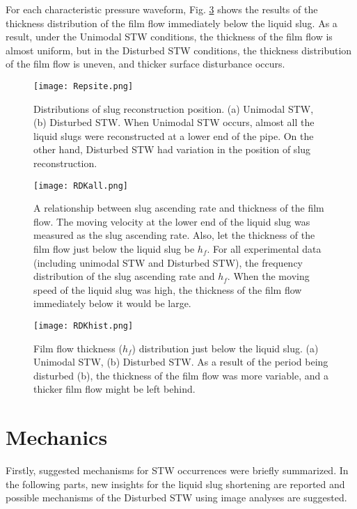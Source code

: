 \documentclass[aps,pre,preprint,groupedaddress,showkeys]{revtex4-2}
\begin{document}
For each characteristic pressure waveform, Fig. \ref{RDKhist} shows the results of the thickness distribution of the film flow immediately below the liquid slug.
As a result, under the Unimodal STW conditions, the thickness of the film flow is almost uniform, but in the Disturbed STW conditions, the thickness distribution of the film flow is uneven, and thicker surface disturbance occurs.

\begin{figure}
\texttt{[image: Repsite.png]} 
\caption{\label{Repsite}Distributions of slug reconstruction position. (a) Unimodal STW, (b) Disturbed STW. When Unimodal STW occurs, almost all the liquid slugs were reconstructed at a lower end of the pipe.
On the other hand, Disturbed STW had variation in the position of slug reconstruction.}
\end{figure} 

\begin{figure}
\texttt{[image: RDKall.png]} 
\caption{\label{RDKall}A relationship between slug ascending rate and thickness of the film flow.
The moving velocity at the lower end of the liquid slug was measured as the slug ascending rate.
Also, let the thickness of the film flow just below the liquid slug be $ h_f $.
For all experimental data (including unimodal STW and Disturbed STW), the frequency distribution of the slug ascending rate and $ h_f $.
When the moving speed of the liquid slug was high, the thickness of the film flow immediately below it would be large.}
\end{figure} 


\begin{figure}
\texttt{[image: RDKhist.png]} 
\caption{\label{RDKhist}Film flow thickness ($ h_f $) distribution just below the liquid slug.
(a) Unimodal STW, (b) Disturbed STW.
As a result of the period being disturbed (b), the thickness of the film flow was more variable, and a thicker film flow might be left behind.}
\end{figure} 

\section{Mechanics}\label{mec}
Firstly, suggested mechanisms for STW occurrences were briefly summarized.
In the following parts, new insights for the liquid slug shortening are reported and possible mechanisms of the Disturbed STW using image analyses are suggested.
\end{document}
